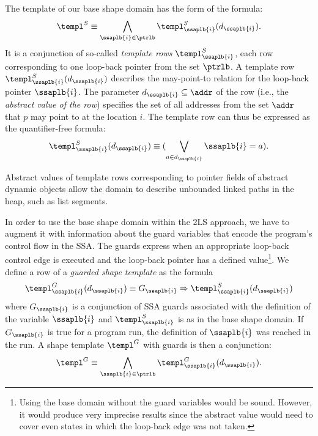 {The template of our base shape domain has the form of the formula:
\begin{equation}\label{eq:templ_shape}
\begin{split}
\templ^S \equiv \bigwedge_{\ssaplb{i} \in \ptrlb}
\templ^S_{\ssaplb{i}}(d_{\ssaplb{i}}).
\end{split}
\end{equation}
%
It is a conjunction of so-called \emph{template rows} $\templ^S_{\ssaplb{i}}$,
each row corresponding to one loop-back pointer from the set $\ptrlb$.
%
A template row $\templ^S_{\ssaplb{i}}(d_{\ssaplb{i}})$ describes the
may-point-to relation for the loop-back pointer $\ssaplb{i}$.
%
The parameter $d_{\ssaplb{i}} \subseteq \addr$ of the row (i.e., the
\emph{abstract value of the row}) specifies the set of all addresses from the
set $\addr$ that $p$ may point to at the location $i$.
%
The template row can thus be expressed as the quantifier-free formula:
\begin{equation}\label{eq:templ_row}
\begin{split}
\templ^S_{\ssaplb{i}}(d_{\ssaplb{i}}) \equiv (\bigvee_{a \in
d_{\ssaplb{i}}} \ssaplb{i} = a).
\end{split}
\end{equation}
  
Abstract values of template rows corresponding to pointer fields of abstract
dynamic objects allow the domain to describe unbounded linked paths in the heap,
such as list segments.

In order to use the base shape domain within the 2LS approach, we have to augment it
with information about the guard variables that encode the program's control
flow in the SSA. The guards express when an appropriate loop-back control edge
is executed and the loop-back pointer has a defined value\footnote{Using the base domain without the guard variables would be sound. However, it
would produce very imprecise results since the abstract value would
need to cover even states in which the loop-back edge was not taken.}.
%
We define a row of a \emph{guarded shape template}
as the formula
\begin{equation}\label{eq:templ_row_guard}
\begin{split}
\templ^G_{\ssaplb{i}}(d_{\ssaplb{i}}) \equiv G_{\ssaplb{i}}
\Rightarrow \templ^S_{\ssaplb{i}}(d_{\ssaplb{i}})
\end{split}
\end{equation}
where $G_{\ssaplb{i}}$ is a conjunction of SSA guards associated with the definition of the variable
$\ssaplb{i}$ and $\templ^S_{\ssaplb{i}}$ is as in the base shape domain.
%
If $G_{\ssaplb{i}}$ is true for a program run, the definition of $\ssaplb{i}$
was reached in the run.
%
A shape template $\templ^G$ with guards is then a conjunction:
\begin{equation}\label{eq:templ_guard}
\begin{split}
\templ^G \equiv \bigwedge_{\ssaplb{i} \in \ptrlb}
\templ^G_{\ssaplb{i}}(d_{\ssaplb{i}}).
\end{split}
\end{equation}

}
